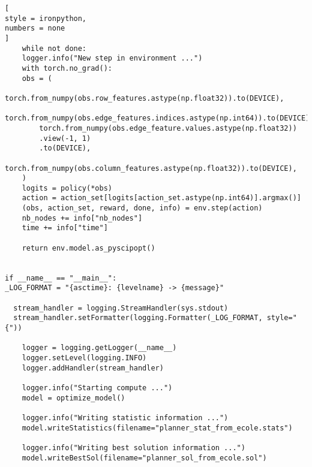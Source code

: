 \documentclass[%
	11pt,
	a4paper,
	utf8,
		]{article}
\begin{document}
\begin{lstlisting}[
style = ironpython,
numbers = none
]
	while not done:
	logger.info("New step in environment ...")
	with torch.no_grad():
	obs = (
		torch.from_numpy(obs.row_features.astype(np.float32)).to(DEVICE),
		torch.from_numpy(obs.edge_features.indices.astype(np.int64)).to(DEVICE),
		torch.from_numpy(obs.edge_feature.values.astype(np.float32))
		.view(-1, 1)
		.to(DEVICE),
		torch.from_numpy(obs.column_features.astype(np.float32)).to(DEVICE),
	)
	logits = policy(*obs)
	action = action_set[logits[action_set.astype(np.int64)].argmax()]
	(obs, action_set, reward, done, info) = env.step(action)
	nb_nodes += info["nb_nodes"]
	time += info["time"]

	return env.model.as_pyscipopt()


if __name__ == "__main__":
_LOG_FORMAT = "{asctime}: {levelname} -> {message}"

  stream_handler = logging.StreamHandler(sys.stdout)
  stream_handler.setFormatter(logging.Formatter(_LOG_FORMAT, style="{"))

	logger = logging.getLogger(__name__)
	logger.setLevel(logging.INFO)
	logger.addHandler(stream_handler)

	logger.info("Starting compute ...")
	model = optimize_model()

	logger.info("Writing statistic information ...")
	model.writeStatistics(filename="planner_stat_from_ecole.stats")

	logger.info("Writing best solution information ...")
	model.writeBestSol(filename="planner_sol_from_ecole.sol")
\end{lstlisting}

\end{document}
